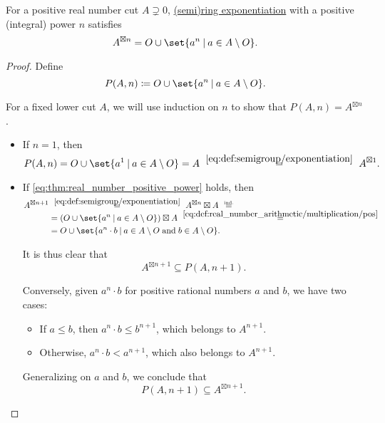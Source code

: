\begin{proposition}\label{thm:real_number_positive_power}
  For a positive real number cut \( A \supsetneq 0 \), \hyperref[def:semiring/exponentiation]{(semi)ring exponentiation} with a positive (integral) power \( n \) satisfies
  \begin{equation}\label{eq:thm:real_number_positive_power}
    A^{\boxtimes n} = O \cup \set{ a^n \given a \in A \setminus O }.
  \end{equation}
\end{proposition}
\begin{proof}
  Define
  \begin{equation*}
    P(A, n) \coloneqq O \cup \set{ a^n \given a \in A \setminus O }.
  \end{equation*}

  For a fixed lower cut \( A \), we will use induction on \( n \) to show that \( P(A, n) = A^{\boxtimes n} \).

  \begin{itemize}
    \item If \( n = 1 \), then
    \begin{equation*}
      P(A, n)
      =
      O \cup \set{ a^1 \given a \in A \setminus O }
      =
      A
      \reloset {\eqref{eq:def:semigroup/exponentiation}} =
      A^{\boxtimes 1}.
    \end{equation*}

    \item If \eqref{eq:thm:real_number_positive_power} holds, then
    \begin{align*}
      A^{\boxtimes n+1}
      &\reloset {\eqref{eq:def:semigroup/exponentiation}} =
      A^{\boxtimes n} \boxtimes A
      \reloset {\T{ind.}} = \\ &=
      (O \cup \set{ a^n \given a \in A \setminus O }) \boxtimes A
      \reloset {\eqref{eq:def:real_number_arithmetic/multiplication/pos}} = \\ &=
      O \cup \set{ a^n \cdot b \given a \in A \setminus O \T{and} b \in A \setminus O }.
    \end{align*}

    It is thus clear that
    \begin{equation*}
      A^{\boxtimes n+1} \subseteq P(A, n+1).
    \end{equation*}

    Conversely, given \( a^n \cdot b \) for positive rational numbers \( a \) and \( b \), we have two cases:
    \begin{itemize}
      \item If \( a \leq b \), then \( a^n \cdot b \leq b^{n+1} \), which belongs to \( A^{n+1} \).
      \item Otherwise, \( a^n \cdot b < a^{n+1} \), which also belongs to \( A^{n+1} \).
    \end{itemize}

    Generalizing on \( a \) and \( b \), we conclude that
    \begin{equation*}
      P(A, n+1) \subseteq A^{\boxtimes n+1}.
    \end{equation*}
  \end{itemize}
\end{proof}

